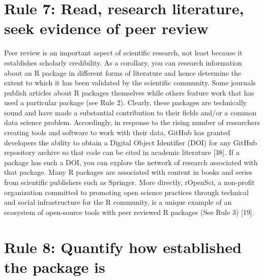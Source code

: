 \documentclass[10pt,letterpaper]{article}
\begin{document}
\hypertarget{rule-7-read-research-literature-seek-evidence-of-peer-review}{%
\section{Rule 7: Read, research literature, seek evidence of peer
review}\label{rule-7-read-research-literature-seek-evidence-of-peer-review}}

Peer review is an important aspect of scientific research, not least
because it establishes scholarly credibility. As a corollary, you can
research information about an R package in different forms of literature
and hence determine the extent to which it has been validated by the
scientific community. Some journals publish articles about R packages
themselves while others feature work that has used a particular package
(see Rule 2). Clearly, these packages are technically sound and have
made a substantial contribution to their fields and/or a common data
science problem. Accordingly, in response to the rising number of
researchers creating tools and software to work with their data, GitHub
has granted developers the ability to obtain a Digital Object Identifier
(DOI) for any GitHub repository archive so that code can be cited in
academic literature {[}38{]}. If a package has such a DOI, you can
explore the network of research associated with that package. Many R
packages are associated with content in books and series from scientific
publishers such as Springer. More directly, rOpenSci, a non-profit
organization committed to promoting open science practices through
technical and social infrastructure for the R community, is a unique
example of an ecosystem of open-source tools with peer reviewed R
packages (See Rule 3) {[}19{]}.

\hypertarget{rule-8-quantify-how-established-the-package-is}{%
\section{Rule 8: Quantify how established the package
is}\label{rule-8-quantify-how-established-the-package-is}}
\end{document}
